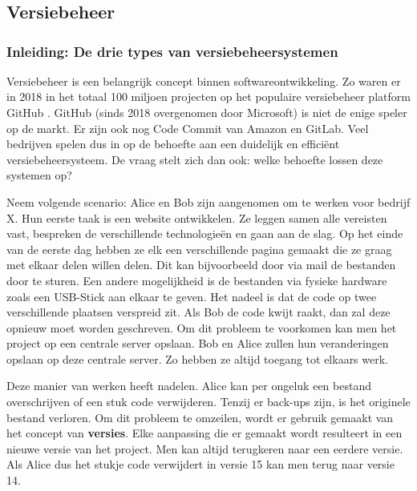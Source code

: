\chapter{}
\label{ch:stand-van-zaken}
\graphicspath{{../../Images/}} 
\section{Versiebeheer}
\subsection{Inleiding: De drie types van versiebeheersystemen}
\label{sec:vb_inleiding}
Versiebeheer is een belangrijk concept binnen softwareontwikkeling. Zo waren er in 2018 in het  totaal 100 miljoen projecten op het populaire versiebeheer platform GitHub \autocite{Git2018}. GitHub (sinds 2018 overgenomen door Microsoft) is niet de enige speler op de markt. Er zijn ook nog Code Commit van Amazon en GitLab. Veel bedrijven spelen dus in op de behoefte aan een duidelijk en efficiënt versiebeheersysteem. De vraag stelt zich dan ook: welke behoefte lossen deze systemen op?

Neem volgende scenario: Alice en Bob zijn aangenomen om te werken voor bedrijf X. Hun eerste taak is een website ontwikkelen. Ze leggen samen alle vereisten vast, bespreken de verschillende technologieën en gaan aan de slag. Op het einde van de eerste dag hebben ze elk een verschillende pagina gemaakt die ze graag met elkaar delen willen delen. Dit kan bijvoorbeeld door via mail de bestanden door te sturen. Een andere mogelijkheid is de bestanden via fysieke hardware zoals een USB-Stick aan elkaar te geven. Het nadeel is dat de code op twee verschillende plaatsen verspreid zit. Als Bob de code kwijt raakt, dan zal deze opnieuw moet worden geschreven. Om dit probleem te voorkomen kan men het project op een centrale server opslaan. Bob en Alice zullen hun veranderingen opslaan op deze centrale server. Zo hebben ze altijd toegang tot elkaars werk. 

Deze manier van werken heeft nadelen. Alice kan per ongeluk een bestand overschrijven of een stuk code verwijderen. Tenzij er back-ups zijn, is het originele bestand verloren. Om dit probleem te omzeilen, wordt er gebruik gemaakt van het concept van \textbf{versies}. Elke aanpassing die er gemaakt wordt resulteert in een nieuwe versie van het project. Men kan altijd terugkeren naar een eerdere versie. Als Alice dus het stukje code verwijdert in versie 15 kan men terug naar versie 14.

